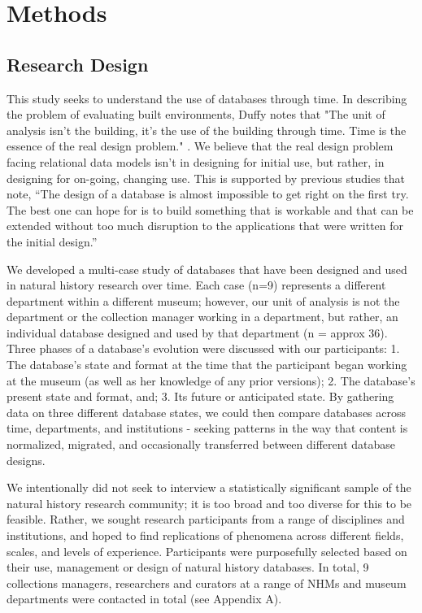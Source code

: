 \section{Methods}

\subsection{Research Design}

This study seeks to understand the use of databases through time. In describing the problem of evaluating built environments, Duffy notes that "The unit of analysis isn't the building, it's the use of the building through time. Time is the essence of the real design problem." \cite{duffy1990measuring}. We believe that the real design problem facing relational data models isn't in designing for initial use, but rather, in designing for on-going, changing use. This is supported by previous studies that note, “The design of a database is almost impossible to get right on the first try. The best one can hope for is to build something that is workable and that can be extended without too much disruption to the applications that were written for the initial design.” \cite{buneman2008curated}

We developed a multi-case study of databases that have been designed and used in natural history research over time. Each case (n=9) represents a different department within a different museum; however, our unit of analysis is not the department or the collection manager working in a department, but rather, an individual database designed and used by that department (n = approx 36). Three phases of a database's evolution were discussed with our participants: 1. The database's state and format at the time that the participant began working at the museum (as well as her knowledge of any prior versions); 2. The database's present state and format, and; 3. Its future or anticipated state. By gathering data on three different database states, we could then compare databases across time, departments, and institutions - seeking patterns in the way that content is normalized, migrated, and occasionally transferred between different database designs. 

We intentionally did not seek to interview a statistically significant sample of the natural history research community; it is too broad and too diverse for this to be feasible. Rather, we sought research participants from a range of disciplines and institutions, and hoped to find replications of phenomena across different fields, scales, and levels of experience. Participants were purposefully selected based on their use, management or design of natural history databases. In total, 9 collections managers, researchers and curators at a range of NHMs and museum departments were contacted in total (see Appendix A).

